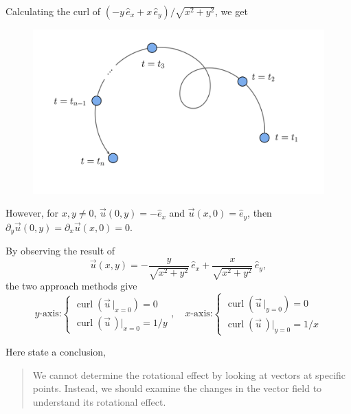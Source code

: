 \documentclass[11pt,]{beamer}
\begin{document}
\begin{frame}
	Calculating the curl of $\left(-y\,\hat{e}_x + x\,\hat{e}_y\right)/\sqrt{x^2+y^2}$, we get
	\begin{figure}
    \includegraphics[page=9, width=0.9\linewidth]{imgs.pdf}
	\end{figure}
	
	However, for $x,y\neq 0$, $\vec{u}(0,y) = -\hat{e}_x$ and $\vec{u}(x,0) = \hat{e}_y$, then $\partial_{y}\vec{u}(0,y) = \partial_{x}\vec{u}(x,0) = 0$.
\end{frame}
\begin{frame}
	By observing the result of
	\begin{equation*}
	\vec{u}(x,y) = -\frac{y}{\sqrt{x^2+y^2}}\,\hat{e}_x + \frac{x}{\sqrt{x^2+y^2}}\,\hat{e}_y,
	\end{equation*}
	the two approach methods give
	\begin{equation}
	\text{$y$-axis:}
	\begin{cases}
	\operatorname{curl}\left(\vec{u}\,\Big|_{x=0}\right) = 0\\[6pt]
	\operatorname{curl}\left(\vec{u}\,\right)\Big|_{x=0} = 1/y
	\end{cases},\quad 
	\text{$x$-axis:}
	\begin{cases}
	\operatorname{curl}\left(\vec{u}\,\Big|_{y=0}\right) = 0\\[6pt]
	\operatorname{curl}\left(\vec{u}\,\right)\Big|_{y=0} = 1/x
	\end{cases}
	\end{equation} 

	Here state a conclusion,
	\begin{quote}
	\bigskip
	We cannot determine the rotational effect by looking at vectors at specific points. Instead, we should examine the changes in the vector field to understand its rotational effect.
	\end{quote}
\end{frame}
\end{document}
